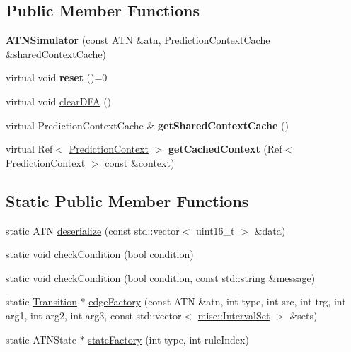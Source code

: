 \subsection*{Public Member Functions}
\begin{DoxyCompactItemize}
\item 
\mbox{\label{classantlr4_1_1atn_1_1ATNSimulator_aea00369023c5b32d3b73e9e4b2726cbe}} 
{\bfseries A\+T\+N\+Simulator} (const A\+TN \&atn, Prediction\+Context\+Cache \&shared\+Context\+Cache)
\item 
\mbox{\label{classantlr4_1_1atn_1_1ATNSimulator_a282a76fb17fd8529c48e695b4dc5134c}} 
virtual void {\bfseries reset} ()=0
\item 
virtual void \hyperlink{classantlr4_1_1atn_1_1ATNSimulator_a3358fa3e8ebcb4abeeceb914b0b07f10}{clear\+D\+FA} ()
\item 
\mbox{\label{classantlr4_1_1atn_1_1ATNSimulator_a112cafa9554cff202c037672ddc918e5}} 
virtual Prediction\+Context\+Cache \& {\bfseries get\+Shared\+Context\+Cache} ()
\item 
\mbox{\label{classantlr4_1_1atn_1_1ATNSimulator_aa4fb144eaf79bf6052a0abe290f7a3a2}} 
virtual Ref$<$ \hyperlink{classantlr4_1_1atn_1_1PredictionContext}{Prediction\+Context} $>$ {\bfseries get\+Cached\+Context} (Ref$<$ \hyperlink{classantlr4_1_1atn_1_1PredictionContext}{Prediction\+Context} $>$ const \&context)
\end{DoxyCompactItemize}
\subsection*{Static Public Member Functions}
\begin{DoxyCompactItemize}
\item 
static A\+TN \hyperlink{classantlr4_1_1atn_1_1ATNSimulator_ae516df637ee1f4be4787d533ed88b3b9}{deserialize} (const std\+::vector$<$ uint16\+\_\+t $>$ \&data)
\item 
static void \hyperlink{classantlr4_1_1atn_1_1ATNSimulator_aa827be017f3bf3a431ef91972d38e3d1}{check\+Condition} (bool condition)
\item 
static void \hyperlink{classantlr4_1_1atn_1_1ATNSimulator_a394cdeb1e2d6028bc73e0f1d22830b3d}{check\+Condition} (bool condition, const std\+::string \&message)
\item 
static \hyperlink{classantlr4_1_1atn_1_1Transition}{Transition} $\ast$ \hyperlink{classantlr4_1_1atn_1_1ATNSimulator_a8e3fc8caefaecf90ac5eb45561aafdcc}{edge\+Factory} (const A\+TN \&atn, int type, int src, int trg, int arg1, int arg2, int arg3, const std\+::vector$<$ \hyperlink{classantlr4_1_1misc_1_1IntervalSet}{misc\+::\+Interval\+Set} $>$ \&sets)
\item 
static A\+T\+N\+State $\ast$ \hyperlink{classantlr4_1_1atn_1_1ATNSimulator_a57878604b6496cc6aa80e29811e05660}{state\+Factory} (int type, int rule\+Index)
\end{DoxyCompactItemize}
